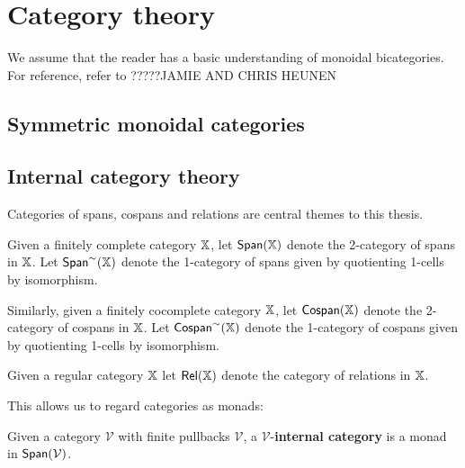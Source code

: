 
\section{Category theory}





We assume that the reader has a basic understanding of monoidal bicategories.  For reference, refer to ?????JAMIE AND CHRIS HEUNEN

\subsection{Symmetric monoidal categories}


\subsection{Internal category theory}

%
%
%
%
%
%
%


Categories of spans, cospans and relations are central themes to this thesis.

\begin{definition}
Given a finitely complete category $\mathbb{X}$, let $\mathsf{Span}(\mathbb{X})$ denote the 2-category of spans in $\mathbb{X}$.  Let $\mathsf{Span}^\sim(\mathbb{X})$ denote the 1-category of spans given by quotienting 1-cells by isomorphism.

Similarly, given a finitely cocomplete category $\mathbb{X}$, let ${\sf Cospan}(\mathbb{X})$ denote the 2-category of cospans in $\mathbb{X}$.  Let ${\sf Cospan}^\sim(\mathbb{X})$ denote the 1-category of cospans given by quotienting 1-cells by isomorphism.

Given a regular category $\mathbb{X}$ let $\mathsf{Rel}(\mathbb{X})$ denote the category of relations in $\mathbb{X}$.
\end{definition}

This allows us to regard categories as monads:
\begin{definition}
\label{def:monad}
\end{definition}


\begin{definition}
\label{def:internalcat}

Given a category $\mathcal V$ with finite pullbacks $\mathcal V$, a $\mathcal V$-{\bf internal category} is a monad in $\mathsf{Span}(\mathcal V)$.
\end{definition}


